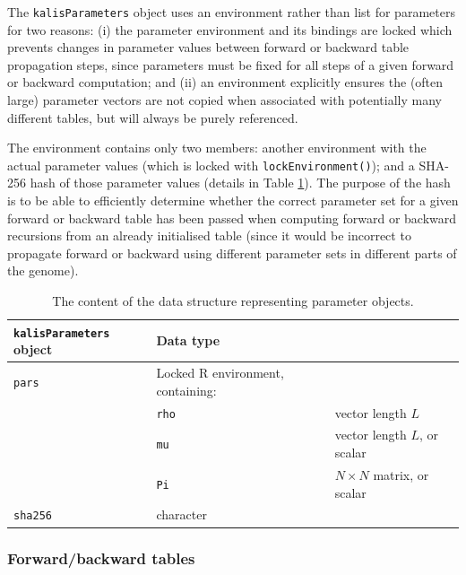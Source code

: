 \documentclass[pdflatex,referee,lineno,sn-nature]{sn-jnl}%
\let\proglang=\textsf
\begin{document}
The \texttt{kalisParameters} object uses an environment rather than list for parameters for two reasons: (i) the parameter environment and its bindings are locked which prevents changes in parameter values between forward or backward table propagation steps, since parameters must be fixed for all steps of a given forward or backward computation; and (ii) an environment explicitly ensures the (often large) parameter vectors are not copied when associated with potentially many different tables, but will always be purely referenced.

The environment contains only two members: another environment with the actual parameter values (which is locked with \texttt{lockEnvironment()}); and a SHA-256 hash of those parameter values (details in Table \ref{tab:pars}).
The purpose of the hash is to be able to efficiently determine whether the correct parameter set for a given forward or backward table has been passed when computing forward or backward recursions from an already initialised table (since it would be incorrect to propagate forward or backward using different parameter sets in different parts of the genome).

\begin{table}[tbp]
	\centering
	\begin{tabular}{l|ll}
		\hline
		\texttt{kalisParameters} object & Data type & \\ \hline\hline
		\texttt{pars} & Locked \proglang{R} environment, containing: \\
		& \texttt{rho} & vector length $L$ \\
		& \texttt{mu} & vector length $L$, or scalar \\
		& \texttt{Pi} & $N \times N$ matrix, or scalar \\
		\texttt{sha256} & character & \\ \hline
	\end{tabular}
	\caption{The content of the data structure representing parameter objects.}
	\label{tab:pars}
\end{table}



\subsubsection*{Forward/backward tables}
\label{forwardbackward-tables}
\end{document}
